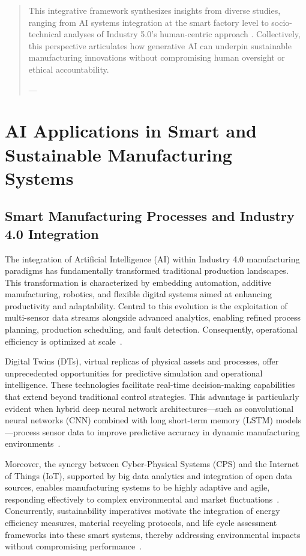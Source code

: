 \documentclass[11pt]{article}
\begin{document}
\begin{abstract}
This integrative framework synthesizes insights from diverse studies, ranging from AI systems integration at the smart factory level \cite{ref11} to socio-technical analyses of Industry 5.0’s human-centric approach \cite{ref19}. Collectively, this perspective articulates how generative AI can underpin sustainable manufacturing innovations without compromising human oversight or ethical accountability.

---
\end{abstract}\section{AI Applications in Smart and Sustainable Manufacturing Systems}

\subsection{Smart Manufacturing Processes and Industry 4.0 Integration}

The integration of Artificial Intelligence (AI) within Industry 4.0 manufacturing paradigms has fundamentally transformed traditional production landscapes. This transformation is characterized by embedding automation, additive manufacturing, robotics, and flexible digital systems aimed at enhancing productivity and adaptability. Central to this evolution is the exploitation of multi-sensor data streams alongside advanced analytics, enabling refined process planning, production scheduling, and fault detection. Consequently, operational efficiency is optimized at scale~\cite{6,7}.  

Digital Twins (DTs), virtual replicas of physical assets and processes, offer unprecedented opportunities for predictive simulation and operational intelligence. These technologies facilitate real-time decision-making capabilities that extend beyond traditional control strategies. This advantage is particularly evident when hybrid deep neural network architectures—such as convolutional neural networks (CNN) combined with long short-term memory (LSTM) models—process sensor data to improve predictive accuracy in dynamic manufacturing environments~\cite{31,33,35}.  

Moreover, the synergy between Cyber-Physical Systems (CPS) and the Internet of Things (IoT), supported by big data analytics and integration of open data sources, enables manufacturing systems to be highly adaptive and agile, responding effectively to complex environmental and market fluctuations~\cite{9,20,22}. Concurrently, sustainability imperatives motivate the integration of energy efficiency measures, material recycling protocols, and life cycle assessment frameworks into these smart systems, thereby addressing environmental impacts without compromising performance~\cite{38,41}.  
\end{document}
